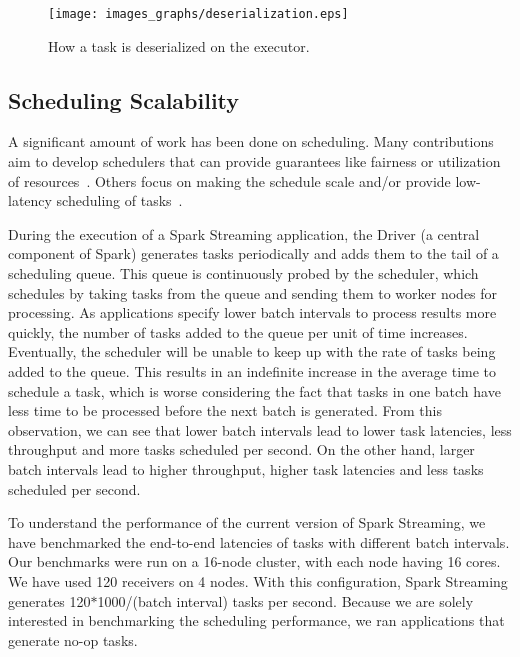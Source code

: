 \begin{figure}[t!]
  \begin{center}
    \texttt{[image: images\_graphs/deserialization.eps]}
  \end{center}
  \caption{How a task is deserialized on the executor. }
  \label{fig:deserialization}
\end{figure}

\subsection{Scheduling Scalability}

A significant amount of work has been done on scheduling. Many contributions aim to develop schedulers that can provide guarantees like fairness or utilization of resources~\cite{}. Others focus on making the schedule scale and/or provide low-latency scheduling of tasks~\cite{Sparrow, CFS}.

During the execution of a Spark Streaming application, the Driver (a central component of Spark) generates tasks periodically and adds them to the tail of a scheduling queue. This queue is continuously probed by the scheduler, which schedules by taking tasks from the queue and sending them to worker nodes for processing.
As applications specify lower batch intervals to process results more quickly, the number of tasks added to the queue per unit of time increases. Eventually, the scheduler will be unable to keep up with the rate of tasks being added to the queue. This results in an indefinite increase in the average time to schedule a task, which is worse considering the fact that tasks in one batch have less time to be processed before the next batch is generated.
From this observation, we can see that lower batch intervals lead to lower task latencies, less throughput and more tasks scheduled per second. On the other hand, larger batch intervals lead to higher throughput, higher task latencies and less tasks scheduled per second. 

To understand the performance of the current version of Spark Streaming, we have benchmarked the end-to-end latencies of tasks with different batch intervals. 
Our benchmarks were run on a 16-node cluster, with each node having 16 cores. We have used 120 receivers on 4 nodes. 
With this configuration, Spark Streaming generates 120$*$1000/(batch interval) tasks per second.
Because we are solely interested in benchmarking the scheduling performance, we ran applications that generate no-op tasks.


